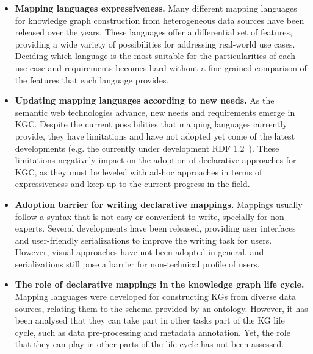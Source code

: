 \begin{itemize}
    \item \textbf{Mapping languages expressiveness.} Many different mapping languages for knowledge graph construction from heterogeneous data sources have been released over the years. These languages offer a differential set of features, providing a wide variety of possibilities for addressing real-world use cases. Deciding which language is the most suitable for the particularities of each use case and requirements becomes hard without a fine-grained comparison of the features that each language provides. 
    
    \item \textbf{Updating mapping languages according to new needs.} As the semantic web technologies advance, new needs and requirements emerge in KGC. Despite the current possibilities that mapping languages currently provide, they have limitations and have not adopted yet come of the latest developments (e.g. the currently under development RDF 1.2~\parencite{hartig2023rdf}). These limitations negatively impact on the adoption of declarative approaches for KGC, as they must be leveled with ad-hoc approaches in terms of expressiveness and keep up to the current progress in the field.
    
    \item \textbf{Adoption barrier for writing declarative mappings.} Mappings usually follow a syntax that is not easy or convenient to write, specially for non-experts. Several developments have been released, providing user interfaces and user-friendly serializations to improve the writing task for users. However, visual approaches have not been adopted in general, and serializations still pose a barrier for non-technical profile of users. 
    
    \item \textbf{The role of declarative mappings in the knowledge graph life cycle.} Mapping languages were developed for constructing KGs from diverse data sources, relating them to the schema provided by an ontology. However, it has been analysed that they can take part in other tasks part of the KG life cycle, such as data pre-processing and metadata annotation. Yet, the role that they can play in other parts of the life cycle has not been assessed. 
\end{itemize}